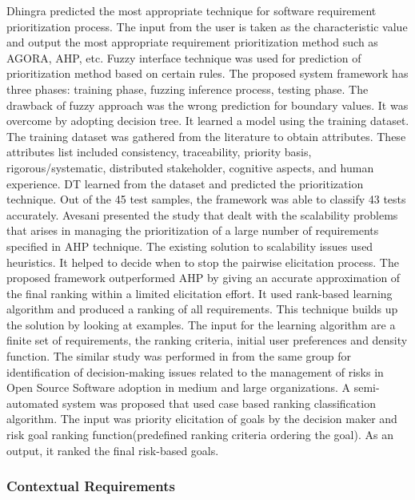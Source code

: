  Dhingra \etal  \cite{S.Dhingra} predicted the most appropriate technique for software requirement prioritization process. The input from the user is taken as the characteristic value and output the most appropriate requirement prioritization method such as AGORA, AHP, etc. Fuzzy interface technique was used for prediction of prioritization method based on certain rules. The proposed system framework has three phases: training phase, fuzzing inference process, testing phase. The drawback of fuzzy approach was the wrong prediction for boundary values. It was overcome by adopting decision tree. It learned a model using the training dataset. The training dataset was gathered from the literature to obtain attributes. These attributes list included consistency,
traceability, priority basis, rigorous/systematic, distributed stakeholder,
cognitive aspects, and human experience.  DT learned from the dataset and predicted the prioritization technique. Out of the 45 test samples,
the framework was able to classify 43 tests accurately. Avesani \etal \cite{PAvesani} presented the study that dealt with the scalability
problems that arises in managing the prioritization
of a large number of requirements specified in AHP technique.  The existing solution to scalability issues used heuristics. It helped to decide when to stop the pairwise elicitation process. The proposed framework outperformed AHP by giving an accurate approximation of the final ranking within a limited elicitation effort. It used rank-based learning algorithm and produced a ranking of all requirements. This technique builds up the solution by looking at examples. The input for the learning algorithm are a finite set of requirements, the ranking criteria, initial user preferences and density function. 
The similar study was performed in \cite{7320432}from the same group \cite{PAvesani} for identification of decision-making issues related to the management of risks in Open
Source Software adoption in medium and large organizations. A  semi-automated system was proposed that used case based ranking classification algorithm. The input was priority elicitation of goals by the decision maker and risk goal ranking function(predefined ranking criteria ordering the goal). As an output, it ranked the final risk-based goals.






\subsubsection{Contextual Requirements} 

